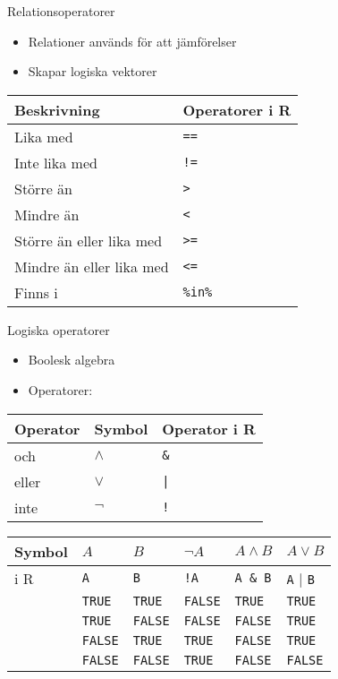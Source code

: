 \documentclass[
  10pt,
  ignorenonframetext,
]{beamer}
\providecommand{\tightlist}{%
  \setlength{\itemsep}{0pt}\setlength{\parskip}{0pt}}
\begin{document}
\begin{frame}{Relationsoperatorer}
\protect\hypertarget{relationsoperatorer}{}
\begin{itemize}
\tightlist
\item
  Relationer används för att jämförelser
\item
  Skapar logiska vektorer
\end{itemize}

\begin{longtable}[]{@{}ll@{}}
\toprule
Beskrivning & Operatorer i R \\
\midrule
\endhead
Lika med & \texttt{==} \\
Inte lika med & \texttt{!=} \\
Större än & \texttt{>} \\
Mindre än & \texttt{<} \\
Större än eller lika med & \texttt{>=} \\
Mindre än eller lika med & \texttt{<=} \\
Finns i & \texttt{\%in\%} \\
\bottomrule
\end{longtable}
\end{frame}


\begin{frame}[fragile]{Logiska operatorer}
\protect\hypertarget{logiska-operatorer}{}
\begin{itemize}
\tightlist
\item
  Boolesk algebra
\item
  Operatorer:
\end{itemize}

\begin{longtable}[]{@{}lll@{}}
\toprule
Operator & Symbol & Operator i R \\
\midrule
\endhead
och & \(\wedge{}\) & \texttt{\&} \\
eller & \(\vee{}\) & \texttt{|} \\
inte & \(\neg{}\) & \texttt{!} \\
\bottomrule
\end{longtable}

\pause

\begin{longtable}[]{@{}llllll@{}}
\toprule
Symbol & \(A\) & \(B\) & \(\neg A\) & \(A \wedge B\) & \(A \vee B\) \\
\midrule
\endhead
i R & \texttt{A} & \texttt{B} & \texttt{!A} & \texttt{A\ \&\ B} &
\texttt{A} \(|\) \texttt{B} \\
& \texttt{TRUE} & \texttt{TRUE} & \texttt{FALSE} & \texttt{TRUE} &
\texttt{TRUE} \\
& \texttt{TRUE} & \texttt{FALSE} & \texttt{FALSE} & \texttt{FALSE} &
\texttt{TRUE} \\
& \texttt{FALSE} & \texttt{TRUE} & \texttt{TRUE} & \texttt{FALSE} &
\texttt{TRUE} \\
& \texttt{FALSE} & \texttt{FALSE} & \texttt{TRUE} & \texttt{FALSE} &
\texttt{FALSE} \\
\bottomrule
\end{longtable}
\end{frame}
\end{document}
